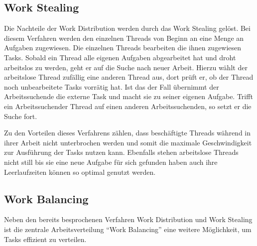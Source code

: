 \documentclass[12pt]{article}
\begin{document}
\subsection{Work Stealing}

Die Nachteile der Work Distribution werden durch das Work Stealing gelöst. Bei diesem Verfahren werden den einzelnen Threads von Beginn an eine Menge an Aufgaben zugewiesen. Die einzelnen Threads bearbeiten die ihnen zugewiesen Tasks. Sobald ein Thread alle eigenen Aufgaben abgearbeitet hat und droht arbeitslos zu werden, geht er auf die Suche nach neuer Arbeit. Hierzu wählt der arbeitslose Thread zufällig eine anderen Thread aus, dort prüft er, ob der Thread noch unbearbeitete Tasks vorrätig hat. Ist das der Fall übernimmt der Arbeitssuchende die externe Task und macht sie zu seiner eigenen Aufgabe. Trifft ein Arbeitssuchender Thread auf einen anderen Arbeitssuchenden, so setzt er die Suche fort.

Zu den Vorteilen dieses Verfahrens zählen, dass beschäftigte Threads während in ihrer Arbeit nicht unterbrochen werden und somit die maximale Geschwindigkeit zur Ausführung der Tasks nutzen kann. Ebenfalls stehen arbeitslose Threads nicht still bis sie eine neue Aufgabe für sich gefunden haben auch ihre Leerlaufzeiten können so optimal genutzt werden.


\subsection{Work Balancing}

Neben den bereits besprochenen Verfahren Work Distribution und Work Stealing ist die zentrale Arbeitsverteilung “Work Balancing” eine weitere Möglichkeit, um Tasks effizient zu verteilen. 



%
%
%
%
\end{document}
